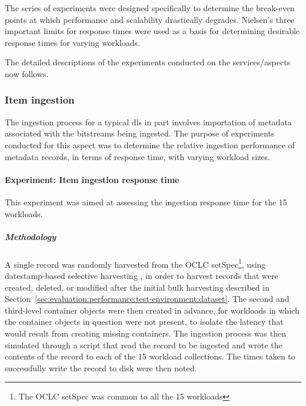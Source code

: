 The series of experiments were designed specifically to determine the break-even points at which performance and scalability drastically degrades. Nielsen's three important limits for response times \citep{Nielsen1993} were used as a basis for determining desirable response times for varying workloads.

The detailed descriptions of the experiments conducted on the services/aspects now follows.

\subsubsection{Item ingestion}
\label{sec:evaluation:performance:ingestion}

The ingestion process for a typical \gls{dls} in part involves importation of metadata associated with the bitstreams being ingested. The purpose of experiments conducted for this aspect was to determine the relative ingestion performance of metadata records, in terms of response time, with varying workload sizes.

\paragraph{Experiment: Item ingestion response time}
\label{sec:evaluation:performance:ingestion:experiment1}

This experiment was aimed at assessing the ingestion response time for the \num{15} workloads.

\subparagraph{Methodology}

A single record was randomly harvested from the OCLC setSpec\footnote{The OCLC setSpec was common to all the 15 workloads}, using datestamp-based selective harvesting \citep{Lagoze2002}, in order to harvest records that were created, deleted, or modified after the initial bulk harvesting described in Section~\ref{sec:evaluation:performance:test-environment:dataset}. The second and third-level container objects were then created in advance, for workloads in which the container objects in question were not present, to isolate the latency that would result from creating missing containers. The ingestion process was then simulated through a script that read the record to be ingested and wrote the contents of the record to each of the 15 workload collections. The times taken to successfully write the record to disk were then noted.

